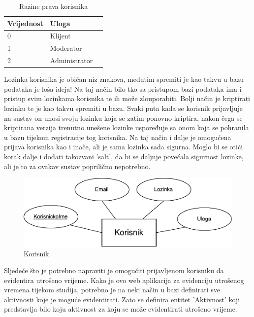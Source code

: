 \documentclass[times, utf8, zavrsni]{fer}
\begin{document}
\begin{table}[H]
\caption{Razine prava korisnika}
\label{tbl:razine_prava}
\centering
\begin{tabular}{llr}
\hline
Vrijednost & Uloga\\
\hline
0 & Klijent \\
1 & Moderator \\
2 & Administrator \\ 
\hline
\end{tabular}
\end{table}

Lozinka korisnika je običan niz znakova, međutim spremiti je kao takvu u bazu podataka je loša ideja! Na taj način bilo tko sa pristupom bazi podataka ima i pristup svim lozinkama korisnika te ih može zlouporabiti. Bolji način je kriptirati lozinku te je kao takvu spremiti u bazu. Svaki puta kada se korisnik prijavljuje na sustav on unosi svoju lozinku koja se zatim ponovno kriptira, nakon čega se kriptirana verzija trenutno unešene lozinke uspoređuje sa onom koja se pohranila u bazu tijekom registracije tog korisnika. Na taj način i dalje je omogućena prijava korisnika kao i inače, ali je sama lozinka sada sigurna. Moglo bi se otići korak dalje i dodati takozvani 'salt', da bi se daljnje povećala sigurnost lozinke, ali je to za ovakav sustav poprilično nepotrebno.\\

\begin{figure}[H]
\centering
\includegraphics[width=\textwidth,height=\textheight,keepaspectratio]{img/korisnik.pdf}
\caption{Korisnik}
\label{fig:korisnik}
\end{figure}

Sljedeće što je potrebno napraviti je omogućiti prijavljenom korisniku da evidentira utrošeno vrijeme. Kako je ovo web aplikacija za evidenciju utrošenog vremena tijekom studija, potrebno je na neki način u bazi definirati sve aktivnosti koje je moguće evidentirati. Zato se definira entitet 'Aktivnost' koji predstavlja bilo koju aktivnost za koju se može evidentirati utrošeno vrijeme. \\
\end{document}

